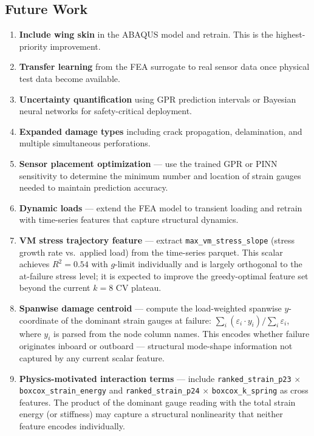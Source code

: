 \documentclass[10pt,letterpaper]{article}
\newcommand{\Rsq}{R^2}
\begin{document}
\subsection{Future Work}

\begin{enumerate}
  \item \textbf{Include wing skin} in the ABAQUS model and retrain. This is the
    highest-priority improvement.
  \item \textbf{Transfer learning} from the FEA surrogate to real sensor data once physical
    test data become available.
  \item \textbf{Uncertainty quantification} using GPR prediction intervals or Bayesian
    neural networks for safety-critical deployment.
  \item \textbf{Expanded damage types} including crack propagation, delamination, and
    multiple simultaneous perforations.
  \item \textbf{Sensor placement optimization} --- use the trained GPR or PINN sensitivity
    to determine the minimum number and location of strain gauges needed to maintain
    prediction accuracy.
  \item \textbf{Dynamic loads} --- extend the FEA model to transient loading and retrain
    with time-series features that capture structural dynamics.
  \item \textbf{VM stress trajectory feature} --- extract \texttt{max\_vm\_stress\_slope}
    (stress growth rate vs.\ applied load) from the time-series parquet. This scalar achieves
    $\Rsq = 0.54$ with $g$-limit individually and is largely orthogonal to the at-failure
    stress level; it is expected to improve the greedy-optimal feature set beyond the current
    $k=8$ CV plateau.
  \item \textbf{Spanwise damage centroid} --- compute the load-weighted spanwise
    $y$-coordinate of the dominant strain gauges at failure:
    $\sum_i (\varepsilon_i \cdot y_i) / \sum_i \varepsilon_i$,
    where $y_i$ is parsed from the node column names. This encodes whether failure
    originates inboard or outboard --- structural mode-shape information not captured by any
    current scalar feature.
  \item \textbf{Physics-motivated interaction terms} --- include
    \texttt{ranked\_strain\_p23} $\times$ \texttt{boxcox\_strain\_energy} and
    \texttt{ranked\_strain\_p24} $\times$ \texttt{boxcox\_k\_spring} as cross features.
    The product of the dominant gauge reading with the total strain energy (or stiffness) may
    capture a structural nonlinearity that neither feature encodes individually.
\end{enumerate}
\end{document}
